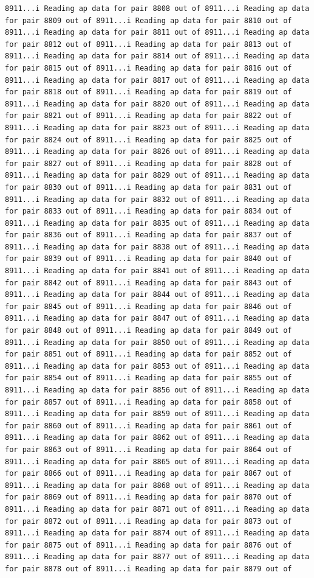 \documentclass[
]{article}
\begin{document}
\begin{verbatim}
8911...i Reading ap data for pair 8808 out of 8911...i Reading ap data for pair 8809 out of 8911...i Reading ap data for pair 8810 out of 8911...i Reading ap data for pair 8811 out of 8911...i Reading ap data for pair 8812 out of 8911...i Reading ap data for pair 8813 out of 8911...i Reading ap data for pair 8814 out of 8911...i Reading ap data for pair 8815 out of 8911...i Reading ap data for pair 8816 out of 8911...i Reading ap data for pair 8817 out of 8911...i Reading ap data for pair 8818 out of 8911...i Reading ap data for pair 8819 out of 8911...i Reading ap data for pair 8820 out of 8911...i Reading ap data for pair 8821 out of 8911...i Reading ap data for pair 8822 out of 8911...i Reading ap data for pair 8823 out of 8911...i Reading ap data for pair 8824 out of 8911...i Reading ap data for pair 8825 out of 8911...i Reading ap data for pair 8826 out of 8911...i Reading ap data for pair 8827 out of 8911...i Reading ap data for pair 8828 out of 8911...i Reading ap data for pair 8829 out of 8911...i Reading ap data for pair 8830 out of 8911...i Reading ap data for pair 8831 out of 8911...i Reading ap data for pair 8832 out of 8911...i Reading ap data for pair 8833 out of 8911...i Reading ap data for pair 8834 out of 8911...i Reading ap data for pair 8835 out of 8911...i Reading ap data for pair 8836 out of 8911...i Reading ap data for pair 8837 out of 8911...i Reading ap data for pair 8838 out of 8911...i Reading ap data for pair 8839 out of 8911...i Reading ap data for pair 8840 out of 8911...i Reading ap data for pair 8841 out of 8911...i Reading ap data for pair 8842 out of 8911...i Reading ap data for pair 8843 out of 8911...i Reading ap data for pair 8844 out of 8911...i Reading ap data for pair 8845 out of 8911...i Reading ap data for pair 8846 out of 8911...i Reading ap data for pair 8847 out of 8911...i Reading ap data for pair 8848 out of 8911...i Reading ap data for pair 8849 out of 8911...i Reading ap data for pair 8850 out of 8911...i Reading ap data for pair 8851 out of 8911...i Reading ap data for pair 8852 out of 8911...i Reading ap data for pair 8853 out of 8911...i Reading ap data for pair 8854 out of 8911...i Reading ap data for pair 8855 out of 8911...i Reading ap data for pair 8856 out of 8911...i Reading ap data for pair 8857 out of 8911...i Reading ap data for pair 8858 out of 8911...i Reading ap data for pair 8859 out of 8911...i Reading ap data for pair 8860 out of 8911...i Reading ap data for pair 8861 out of 8911...i Reading ap data for pair 8862 out of 8911...i Reading ap data for pair 8863 out of 8911...i Reading ap data for pair 8864 out of 8911...i Reading ap data for pair 8865 out of 8911...i Reading ap data for pair 8866 out of 8911...i Reading ap data for pair 8867 out of 8911...i Reading ap data for pair 8868 out of 8911...i Reading ap data for pair 8869 out of 8911...i Reading ap data for pair 8870 out of 8911...i Reading ap data for pair 8871 out of 8911...i Reading ap data for pair 8872 out of 8911...i Reading ap data for pair 8873 out of 8911...i Reading ap data for pair 8874 out of 8911...i Reading ap data for pair 8875 out of 8911...i Reading ap data for pair 8876 out of 8911...i Reading ap data for pair 8877 out of 8911...i Reading ap data for pair 8878 out of 8911...i Reading ap data for pair 8879 out of 
\end{verbatim}
\end{document}

